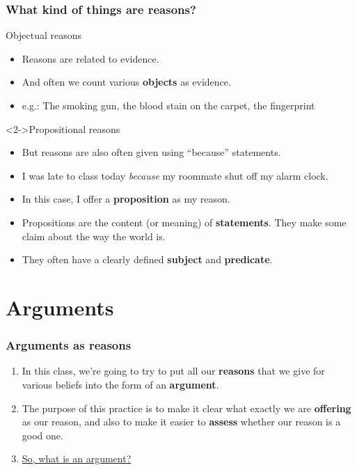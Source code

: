 \documentclass[10pt,letterpaper,xcolor=dvipsnames,handout]{beamer}
\begin{document}
\begin{frame}
\frametitle{What kind of things are reasons?}

\begin{block}{Objectual reasons}
  \begin{itemize}
    \item Reasons are related to evidence.
    \item And often we count various \textbf{objects} as evidence.
    \item e.g.: The smoking gun, the blood stain on the carpet, the fingerprint
  \end{itemize}
\end{block}

\begin{block}<2->{Propositional reasons}
  \begin{itemize}
    \item But reasons are also often given using ``because'' statements.
    \item I was late to class today \textit{because} my roommate shut off my alarm clock.
    \item In this case, I offer a \textbf{proposition} as my reason.
    \item Propositions are the content (or meaning) of \textbf{statements}. They make some claim about the way the world is.
    \item They often have a clearly defined \textbf{subject} and \textbf{predicate}.
  \end{itemize}
\end{block}

\end{frame}

\section{Arguments}

\begin{frame}
\frametitle{Arguments as reasons}

\begin{enumerate}
  \item In this class, we're going to try to put all our \textbf{reasons} that we give for various beliefs into the form of an \textbf{argument}.
  \item<2-> The purpose of this practice is to make it clear what exactly we are \textbf{offering} as our reason, and also to make it easier to \textbf{assess} whether our reason is a good one.
  \item<3->\href{https://www.youtube.com/watch?v=kQFKtI6gn9Y}{So, what is an argument?}
\end{enumerate}
  
\end{frame}
\end{document}
